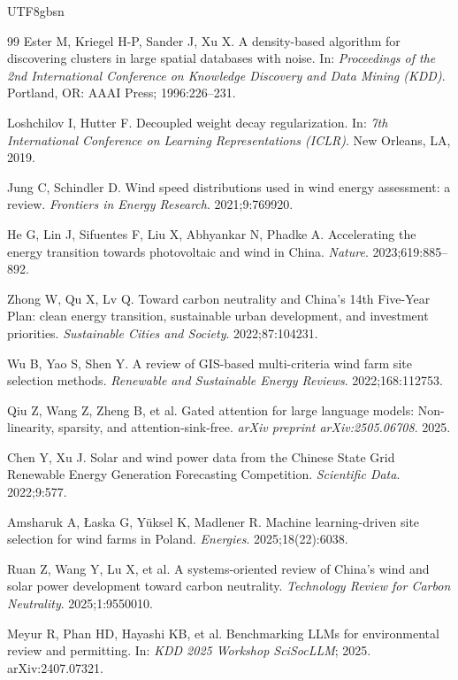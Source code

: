 \documentclass[12pt, a4paper]{article}
\begin{document}
\begin{CJK}{UTF8}{gbsn}
\begin{thebibliography}{99}
Ester M, Kriegel H-P, Sander J, Xu X.
A density-based algorithm for discovering clusters in large
spatial databases with noise.
In: \textit{Proceedings of the 2nd International Conference on
Knowledge Discovery and Data Mining (KDD)}.
Portland, OR: AAAI Press;
1996:226--231.

Loshchilov I, Hutter F.
Decoupled weight decay regularization.
In: \textit{7th International Conference on Learning Representations
(ICLR)}.
New Orleans, LA, 2019.

Jung C, Schindler D.
Wind speed distributions used in wind energy assessment: a review.
\textit{Frontiers in Energy Research}.
2021;9:769920.

He G, Lin J, Sifuentes F, Liu X, Abhyankar N, Phadke A.
Accelerating the energy transition towards photovoltaic
and wind in China.
\textit{Nature}.
2023;619:885--892.

Zhong W, Qu X, Lv Q.
Toward carbon neutrality and China's 14th Five-Year Plan:
clean energy transition, sustainable urban development,
and investment priorities.
\textit{Sustainable Cities and Society}.
2022;87:104231.

Wu B, Yao S, Shen Y.
A review of GIS-based multi-criteria wind farm site selection methods.
\textit{Renewable and Sustainable Energy Reviews}.
2022;168:112753.

Qiu Z, Wang Z, Zheng B, et al.
Gated attention for large language models: Non-linearity, sparsity,
and attention-sink-free.
\textit{arXiv preprint arXiv:2505.06708}. 2025.

Chen Y, Xu J.
Solar and wind power data from the Chinese State Grid
Renewable Energy Generation Forecasting Competition.
\textit{Scientific Data}.
2022;9:577.

Amsharuk A, \L aska G, Y\"{u}ksel K, Madlener R.
Machine learning-driven site selection for wind farms in Poland.
\textit{Energies}.
2025;18(22):6038.

Ruan Z, Wang Y, Lu X, et al.
A systems-oriented review of China's wind and solar power
development toward carbon neutrality.
\textit{Technology Review for Carbon Neutrality}.
2025;1:9550010.

Meyur R, Phan HD, Hayashi KB, et al.
Benchmarking LLMs for environmental review and permitting.
In: \textit{KDD 2025 Workshop SciSocLLM}; 2025.
arXiv:2407.07321.


\end{thebibliography}
\end{CJK}
\end{document}
